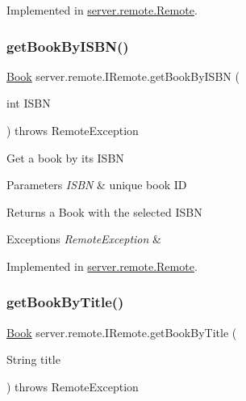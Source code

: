 Implemented in \hyperlink{classserver_1_1remote_1_1_remote_a3d41acc8ab7328be2082573542758f07}{server.\+remote.\+Remote}.

\mbox{\label{interfaceserver_1_1remote_1_1_i_remote_a736183bf7a57f78acf11fb78ae0f0e58}} 
\subsubsection{\texorpdfstring{get\+Book\+By\+I\+S\+B\+N()}{getBookByISBN()}}
{\footnotesize\ttfamily \hyperlink{classserver_1_1data_1_1_book}{Book} server.\+remote.\+I\+Remote.\+get\+Book\+By\+I\+S\+BN (\begin{DoxyParamCaption}\item[{int}]{I\+S\+BN }\end{DoxyParamCaption}) throws Remote\+Exception}

Get a book by its I\+S\+BN 
\begin{DoxyParams}{Parameters}
{\em I\+S\+BN} & unique book ID \\
\hline
\end{DoxyParams}
\begin{DoxyReturn}{Returns}
a Book with the selected I\+S\+BN 
\end{DoxyReturn}

\begin{DoxyExceptions}{Exceptions}
{\em Remote\+Exception} & \\
\hline
\end{DoxyExceptions}


Implemented in \hyperlink{classserver_1_1remote_1_1_remote_a36ffc6f95ea75ad7d393ea296e1bc0cc}{server.\+remote.\+Remote}.

\mbox{\label{interfaceserver_1_1remote_1_1_i_remote_a520cc1af90d13264c14b32e19b5ce712}} 
\subsubsection{\texorpdfstring{get\+Book\+By\+Title()}{getBookByTitle()}}
{\footnotesize\ttfamily \hyperlink{classserver_1_1data_1_1_book}{Book} server.\+remote.\+I\+Remote.\+get\+Book\+By\+Title (\begin{DoxyParamCaption}\item[{String}]{title }\end{DoxyParamCaption}) throws Remote\+Exception}

